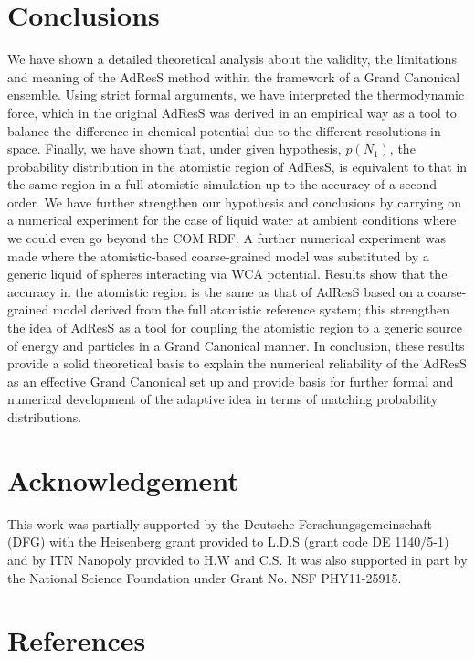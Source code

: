\documentclass[aip,jcp,a4paper,reprint,onecolumn]{revtex4-1}
\begin{document}
\section{Conclusions}
We have shown a detailed theoretical analysis about the validity, the limitations and meaning of the AdResS method within the framework of a Grand Canonical ensemble. Using strict formal arguments, we have interpreted the thermodynamic force, which in the original AdResS was derived in an empirical way as a tool to balance the difference in chemical potential due to the different resolutions in space. Finally, we have shown that, under given hypothesis, $p(N_{1})$, the probability distribution in the atomistic region of AdResS, is equivalent to that in the same region in a full atomistic simulation up to the accuracy of a second order. We have further strengthen our hypothesis and conclusions by carrying on a numerical experiment for the case of liquid water at ambient conditions where we could even go beyond the COM RDF. 
A further numerical experiment was made where the atomistic-based coarse-grained model was substituted by a generic liquid of spheres interacting via WCA potential. Results show that the accuracy in the atomistic region is the same as that of AdResS based on a coarse-grained model derived from the full atomistic reference system; this strengthen the idea of AdResS as a tool for coupling the atomistic region to a generic source of energy and particles in a Grand Canonical manner.
In conclusion, these results provide a solid theoretical basis to explain the numerical reliability of the AdResS as an effective Grand Canonical set up and provide basis for further formal and numerical development of the adaptive idea in terms of matching probability distributions.


\section*{Acknowledgement}
This work was partially supported by the Deutsche Forschungsgemeinschaft (DFG) with the Heisenberg grant provided to L.D.S (grant code DE 1140/5-1) and by ITN Nanopoly provided to H.W and C.S.
It was also supported in part by the National Science Foundation under Grant No. NSF PHY11-25915.



\section*{References}
{}

\end{document}
